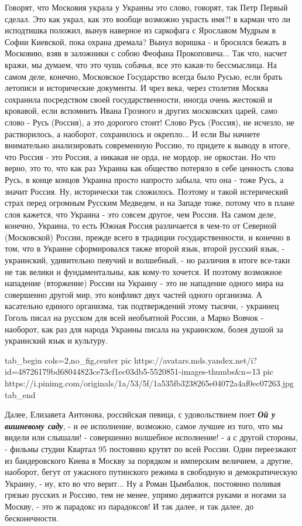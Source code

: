 Говорят, что Московия украла у Украины это слово, говорят, так Петр Первый
сделал. Это как украл, как это вообще возможно украсть имя?! в карман что ли
исподтишка положил, вынув наверное из саркофага с Ярославом Мудрым в Софии
Киевской, пока охрана дремала? Вынул воришка - и бросился бежать в Московию,
взяв в заложники с собою Феофана Прокоповича... Так что, насчет кражи, мы
думаем, что это чушь собачья, все это какая-то бессмыслица. На самом деле,
конечно, Московское Государство всегда было Русью, если брать летописи и
исторические документы. И чрез века, через столетия Москва сохранила
посредством своей государственности, иногда очень жестокой и кровавой, если
вспомнить Ивана Грозного и других московских царей, само слово - Русь (Россия),
а это дорогого стоит! Слово Русь (Россия), не исчезло, не растворилось, а
наоборот, сохранилось и окрепло... И если Вы начнете внимательно анализировать
современную Россию, то придете к выводу в итоге, что Россия - это Россия, а
никакая не орда, не мордор, не оркостан. Но что верно, это то, что как раз
Украина как общество потеряло в себе ценность слова Русь, в конце концов
Украина просто напросто забыла, что она - тоже Русь, а значит Россия. Ну,
исторически так сложилось. Поэтому и такой истерический страх перед огромным
Русским Медведем, и на Западе тоже, потому что в плане слов кажется, что Украина
- это совсем другое, чем Россия. На самом деле, конечно, Украина, то есть Южная
Россия различается в чем-то от Северной (Московской) России, прежде всего в
традиции государственности, и конечно в том, что в Украине сформировался также
второй язык, второй русский язык, - украинский, удивительно певучий и
волшебный, - но различия в итоге все-таки не так велики и фундаментальны, как
кому-то хочется.  И поэтому возможное нападение (вторжение) России на Украину -
это не нападение одного мира на совершенно другой мир, это конфликт двух частей
одного организма. А касательно единого организма, так подтверждений этому
тысячи, - украинец Гоголь писал на русском для всей необъятной России, а Марко
Вовчок - наоборот, как раз для народа Украины писала на украинском, болея душой
за украинский язык и культуру.

\ifcmt
  tab_begin cols=2,no_fig,center
     pic https://avatars.mds.yandex.net/i?id=48726179bd68044823ce73cf1ec03db5-5520851-images-thumbs&n=13
     pic https://i.pinimg.com/originals/1a/53/5f/1a535fb3238265e04072a4af0ec07263.jpg
  tab_end
\fi

Далее, Елизавета Антонова, российская певица, с удовольствием поет
\textbf{\emph{Ой у вишневому саду}}, - и ее исполнение, возможно, самое лучшее
из того, что мы видели или слышали! - совершенно волшебное исполнение! - а с
другой стороны, - фильмы студии Квартал 95 постоянно крутят по всей России.
Одни переезжают из бандеровского Киева в Москву за порядком и имперским
величием, а другие, наоборот, бегут от ужасного путинского режима в свободную и
демократическую Украину, - ну, кто во что верит... Ну а Роман Цымбалюк,
постоянно поливая грязью русских и Россию, тем не менее, упрямо держится руками
и ногами за Москву, - это ж парадокс из парадоксов! И так далее, и так далее,
до бесконечности. 

